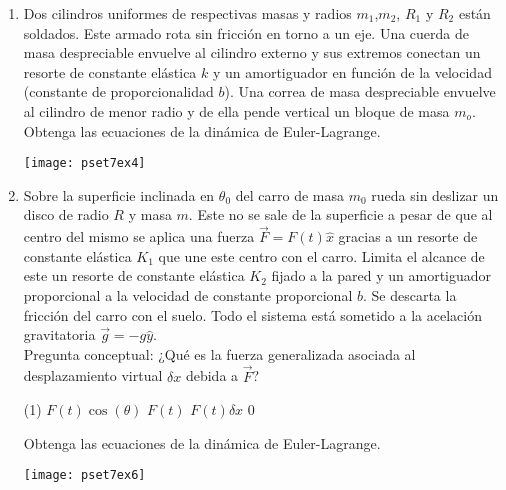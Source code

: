 \documentclass[11pt,spanish,a4paper]{article}
\begin{document}
\begin{enumerate}
\item
\begin{minipage}[t][6cm]{0.6\textwidth}
Dos cilindros uniformes de respectivas masas y radios $m_1$,$m_2$, $R_1$ y $R_2$ están soldados.
Este armado rota sin fricción en torno a un eje.
Una cuerda de masa despreciable envuelve al cilindro externo y sus extremos conectan un resorte de constante elástica $k$ y un amortiguador en función de la velocidad (constante de proporcionalidad $b$).
Una correa de masa despreciable envuelve al cilindro de menor radio y de ella pende vertical un bloque de masa $m_o$.\\
Obtenga las ecuaciones de la dinámica de Euler-Lagrange. 
\end{minipage}
\begin{minipage}[c][2cm][t]{0.35\textwidth}
	\texttt{[image: pset7ex4]}
\end{minipage}


\item
\begin{minipage}[t][7.5cm]{0.5\textwidth}
Sobre la superficie inclinada en $\theta_0$ del carro de masa $m_0$ rueda sin deslizar un disco de radio $R$ y masa $m$.
Este no se sale de la superficie a pesar de que al centro del mismo se aplica una fuerza $\vec{F}= F(t) \hat{x}$ gracias a un resorte de constante elástica $K_1$ que une este centro con el carro.
Limita el alcance de este un resorte de constante elástica $K_2$ fijado a la pared y un amortiguador proporcional a la velocidad de constante proporcional $b$.
Se descarta la fricción del carro con el suelo.
Todo el sistema está sometido a la acelación gravitatoria $\vec{g}= - g \hat{y}$.\\
Pregunta conceptual: ¿Qué es la fuerza generalizada asociada al desplazamiento virtual $\delta x$ debida a $\vec{F}$?\\
\begin{tasks}(1)
	\task $F(t) \cos(\theta)$
	\task $F(t)$
	\task $F(t) \delta x$
	\task $0$
\end{tasks}
Obtenga las ecuaciones de la dinámica de Euler-Lagrange. 
\end{minipage}
\begin{minipage}[c][0cm][t]{0.45\textwidth}
	\texttt{[image: pset7ex6]}
\end{minipage}




\end{enumerate}
\end{document}
